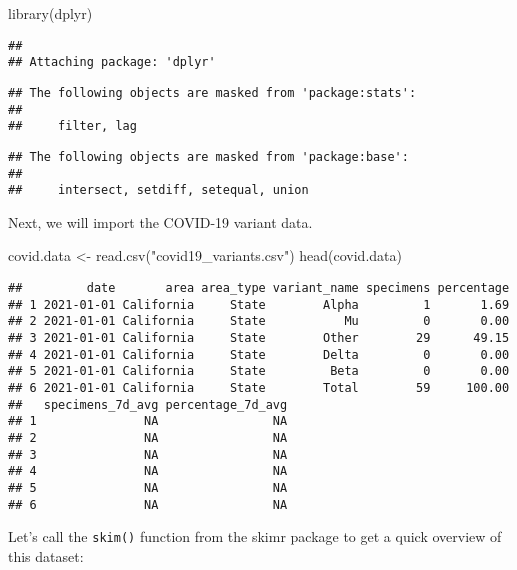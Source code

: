 \documentclass[
]{article}
\newenvironment{Shaded}{\begin{snugshade}}{\end{snugshade}}
\newcommand{\FunctionTok}[1]{\textcolor[rgb]{0.00,0.00,0.00}{#1}}
\newcommand{\NormalTok}[1]{#1}
\newcommand{\OtherTok}[1]{\textcolor[rgb]{0.56,0.35,0.01}{#1}}
\newcommand{\StringTok}[1]{\textcolor[rgb]{0.31,0.60,0.02}{#1}}
\begin{document}
\begin{Shaded}
\begin{Highlighting}[]
\FunctionTok{library}\NormalTok{(dplyr)}
\end{Highlighting}
\end{Shaded}

\begin{verbatim}
## 
## Attaching package: 'dplyr'
\end{verbatim}

\begin{verbatim}
## The following objects are masked from 'package:stats':
## 
##     filter, lag
\end{verbatim}

\begin{verbatim}
## The following objects are masked from 'package:base':
## 
##     intersect, setdiff, setequal, union
\end{verbatim}

Next, we will import the COVID-19 variant data.

\begin{Shaded}
\begin{Highlighting}[]
\NormalTok{covid.data }\OtherTok{\textless{}{-}} \FunctionTok{read.csv}\NormalTok{(}\StringTok{"covid19\_variants.csv"}\NormalTok{)}
\FunctionTok{head}\NormalTok{(covid.data)}
\end{Highlighting}
\end{Shaded}

\begin{verbatim}
##         date       area area_type variant_name specimens percentage
## 1 2021-01-01 California     State        Alpha         1       1.69
## 2 2021-01-01 California     State           Mu         0       0.00
## 3 2021-01-01 California     State        Other        29      49.15
## 4 2021-01-01 California     State        Delta         0       0.00
## 5 2021-01-01 California     State         Beta         0       0.00
## 6 2021-01-01 California     State        Total        59     100.00
##   specimens_7d_avg percentage_7d_avg
## 1               NA                NA
## 2               NA                NA
## 3               NA                NA
## 4               NA                NA
## 5               NA                NA
## 6               NA                NA
\end{verbatim}

Let's call the \texttt{skim()} function from the skimr package to get a
quick overview of this dataset:
\end{document}
